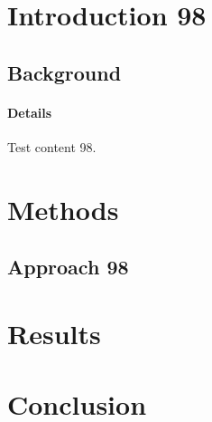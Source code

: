 \documentclass{article}
\begin{document}
\section{Introduction 98}
\subsection{Background}
\paragraph{Details} Test content 98.
\section{Methods}
\subsection{Approach 98}
\section{Results}
\section{Conclusion}
\end{document}
